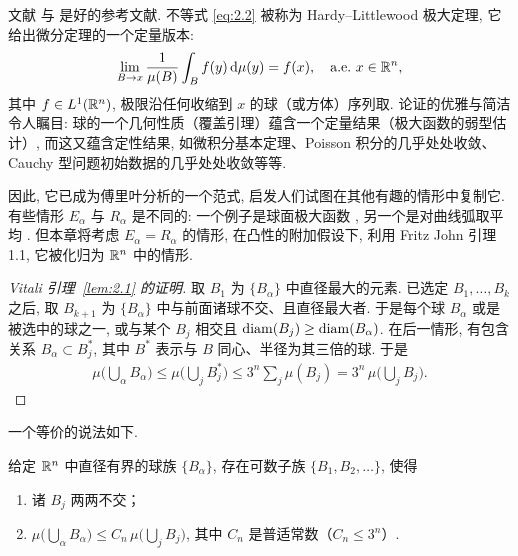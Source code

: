 文献 \cite{b56} 与 \cite{b46} 是好的参考文献. 不等式 \eqref{eq:2.2} 被称为 Hardy--Littlewood 极大定理, 它给出微分定理的一个定量版本:
\begin{align*}
  \lim_{B\to x}\frac{1}{\mu(B)}\int_{B} f(y)\,\mathrm{d}\mu(y)=f(x),\quad\text{a.e.}\ x\in\mathbb{R}^{n},
\end{align*}
其中 $f \in L^1(\mathbb{R}^n)$, 极限沿任何收缩到 $x$ 的球（或方体）序列取. 论证的优雅与简洁令人瞩目: 球的一个几何性质（覆盖引理）蕴含一个定量结果（极大函数的弱型估计）, 而这又蕴含定性结果, 如微积分基本定理、Poisson 积分的几乎处处收敛、Cauchy 型问题初始数据的几乎处处收敛等等.

因此, 它已成为傅里叶分析的一个范式, 启发人们试图在其他有趣的情形中复制它. 有些情形 $E_{\alpha}$ 与 $R_{\alpha}$ 是不同的: 一个例子是球面极大函数 \cite{b54}, 另一个是对曲线弧取平均 \cite{b41}. 但本章将考虑 $E_{\alpha} = R_{\alpha}$ 的情形, 在凸性的附加假设下, 利用 Fritz John 引理 1.1, 它被化归为 $\mathbb{R}^n$ 中的情形.

\begin{proof}[Vitali 引理~\ref{lem:2.1} 的证明]
取 $B_1$ 为 $\{B_\alpha\}$ 中直径最大的元素. 已选定 $B_1, \ldots, B_k$ 之后, 取 $B_{k+1}$ 为 $\{B_\alpha\}$ 中与前面诸球不交、且直径最大者. 于是每个球 $B_\alpha$ 或是被选中的球之一, 或与某个 $B_j$ 相交且 $\operatorname{diam}(B_j) \geq \operatorname{diam}(B_\alpha)$. 在后一情形, 有包含关系 $B_\alpha \subset B_j^*$, 其中 $B^*$ 表示与 $B$ 同心、半径为其三倍的球. 于是
\begin{align*}
  \mu\Big(\bigcup_{\alpha}B_{\alpha}\Big)\leq\mu\Big(\bigcup_{j}B_{j}^{*}\Big)\leq3^{n}\sum_{j}\mu(B_{j})=3^{n}\,\mu\Big(\bigcup_{j}B_{j}\Big).
\end{align*}
\end{proof}

一个等价的说法如下.

\begin{lemma}\label{lem:2.2}
给定 $\mathbb{R}^n$ 中直径有界的球族 $\{B_\alpha\}$, 存在可数子族 $\{B_1, B_2, \ldots\}$, 使得
\begin{enumerate}
\item[(i)] 诸 $B_{j}$ 两两不交；
\item[(ii)] $\mu\bigl(\bigcup_{\alpha} B_{\alpha}\bigr) \leq C_n\, \mu\bigl(\bigcup_j B_j\bigr)$, 其中 $C_n$ 是普适常数（$C_n \leq 3^n$）.
\end{enumerate}
\end{lemma}

